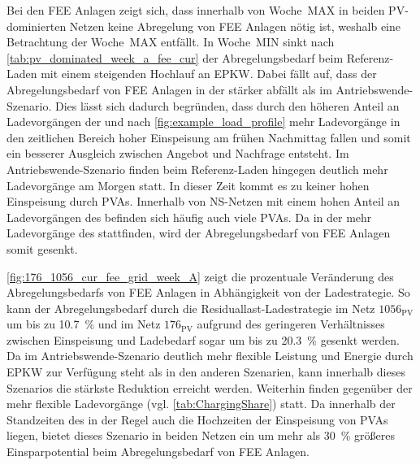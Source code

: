 Bei den \gls{FEE} Anlagen zeigt sich, dass innerhalb von Woche~MAX in beiden \gls{PV}-dominierten Netzen keine Abregelung von \gls{FEE} Anlagen nötig ist, weshalb eine Betrachtung der Woche~MAX entfällt.
In Woche~MIN sinkt nach \autoref{tab:pv_dominated_week_a_fee_cur} der Abregelungsbedarf beim Referenz-Laden mit einem steigenden Hochlauf an \gls{EPKW}.
Dabei fällt auf, dass der Abregelungsbedarf von \gls{FEE} Anlagen in der \SzeFirmenparkplatz stärker abfällt als im Antriebswende-Szenario.
Dies lässt sich dadurch begründen, dass durch den höheren Anteil an Ladevorgängen der \UC \oeffen und \zH nach \autoref{fig:example_load_profile} mehr Ladevorgänge in den zeitlichen Bereich hoher Einspeisung am frühen Nachmittag fallen und somit ein besserer Ausgleich zwischen Angebot und Nachfrage entsteht.
Im Antriebswende-Szenario finden beim Referenz-Laden hingegen deutlich mehr Ladevorgänge am Morgen statt.
In dieser Zeit kommt es zu keiner hohen Einspeisung durch \glspl{PVA}.
Innerhalb von \gls{NS}-Netzen mit einem hohen Anteil an Ladevorgängen des \UC \zH befinden sich häufig auch viele \glspl{PVA}.
Da in der \SzeFirmenparkplatz mehr Ladevorgänge des \UC \zH stattfinden, wird der Abregelungsbedarf von \gls{FEE} Anlagen somit gesenkt.



\autoref{fig:176_1056_cur_fee_grid_week_A} zeigt die prozentuale Veränderung des Abregelungsbedarfs von \gls{FEE} Anlagen in Abhängigkeit von der Ladestrategie.
So kann der Abregelungsbedarf durch die Residuallast-Ladestrategie im Netz \(1056_{\text{PV}}\) um bis zu \SI{10.7}{\percent} und im Netz \(176_{\text{PV}}\) aufgrund des geringeren Verhältnisses zwischen Einspeisung und Ladebedarf sogar um bis zu \SI{20.3}{\percent} gesenkt werden.
Da im Antriebswende-Szenario deutlich mehr flexible Leistung und Energie durch \gls{EPKW} zur Verfügung steht als in den anderen Szenarien, kann innerhalb dieses Szenarios die stärkste Reduktion erreicht werden.
Weiterhin finden gegenüber der \SzeFirmenparkplatz mehr flexible Ladevorgänge (vgl. \autoref{tab:ChargingShare}) statt.
Da innerhalb der Standzeiten des \UC \Firmeparkplatz in der Regel auch die Hochzeiten der Einspeisung von \glspl{PVA} liegen, bietet dieses Szenario in beiden Netzen ein um mehr als \SI{30}{\percent} größeres Einsparpotential beim Abregelungsbedarf von \gls{FEE} Anlagen.




